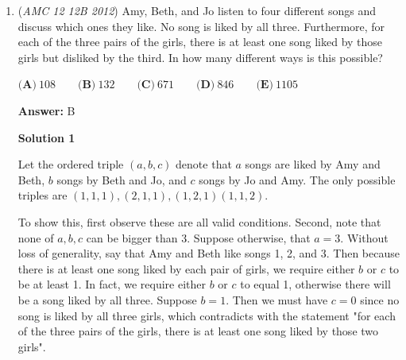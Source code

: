 \begin{enumerate}
\textbf{Solution 2}

If the original radius is $12$, then the circumference is $24\pi$; since arcs are defined by the central angles, the smaller arc, $120$ degree angle, is half the size of the larger sector. so the smaller arc is $8\pi$, and the larger is $16\pi$. Those two arc lengths become the two circumferences of the new cones; so the radius of the smaller cone is $4$ and the larger cone is $8$. Using the Pythagorean theorem, the height of the larger cone is $4\cdot\sqrt{5}$ and the smaller cone is $8\cdot\sqrt{2}$, and now for volume just square the radii and multiply by $\frac{1}{3}$ of the height to get the volume of each cone: $128\cdot\sqrt{2}$ and $256\cdot\sqrt{5}$ [both multiplied by three as ratio come out the same. now divide the volumes by each other to get the final ratio of $\boxed{\textbf{(C) } \frac{\sqrt{10}}{10}}$



	\item (\textit{AMC 12 12B 2012}) Amy, Beth, and Jo listen to four different songs and discuss which ones they like. No song is liked by all three. Furthermore, for each of the three pairs of the girls, there is at least one song liked by those girls but disliked by the third. In how many different ways is this possible?


 $\textbf{(A)}\ 108\qquad\textbf{(B)}\ 132\qquad\textbf{(C)}\ 671\qquad\textbf{(D)}\ 846\qquad\textbf{(E)}\ 1105$

 \textbf{Answer: }B



\textbf{Solution 1}

Let the ordered triple $(a,b,c)$ denote that $a$ songs are liked by Amy and Beth, $b$ songs by Beth and Jo, and $c$ songs by Jo and Amy. The only possible triples are $(1,1,1), (2,1,1), (1,2,1)(1,1,2)$. 

 To show this, first observe these are all valid conditions. Second, note that none of $a,b,c$ can be bigger than 3. Suppose otherwise, that $a = 3$. Without loss of generality, say that Amy and Beth like songs 1, 2, and 3. Then because there is at least one song liked by each pair of girls, we require either $b$ or $c$ to be at least 1. In fact, we require either $b$ or $c$ to equal 1, otherwise there will be a song liked by all three. Suppose $b = 1$. Then we must have $c=0$ since no song is liked by all three girls, which contradicts with the statement "for each of the three pairs of the girls, there is at least one song liked by those two girls".


\end{enumerate}
